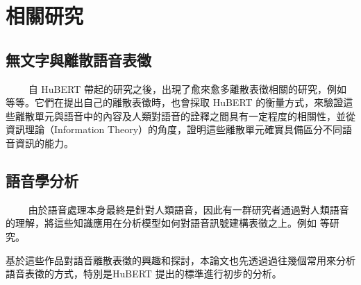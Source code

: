 
\section{相關研究}  %

\subsection{無文字與離散語音表徵}
　　
自 HuBERT 帶起的研究之後，出現了愈來愈多離散表徵相關的研究，例如 \cite{10097097, abdullah23_interspeech, chang_exploration_2023, liu2024dinosr, zhang2024speechtokenizer, huang2023repcodec} 等等。它們在提出自己的離散表徵時，也會採取 HuBERT 的衡量方式，來驗證這些離散單元與語音中的內容及人類對語音的詮釋之間具有一定程度的相關性，並從資訊理論（Information Theory）的角度，證明這些離散單元確實具備區分不同語音資訊的能力。

\subsection{語音學分析}
　　
由於語音處理本身最終是針對人類語音，因此有一群研究者通過對人類語音的理解，將這些知識應用在分析模型如何對語音訊號建構表徵之上。例如 \cite{deseyssel22_interspeech, wells_phonetic_2022, 10097097, abdullah23_interspeech} 等研究。

基於這些作品對語音離散表徵的興趣和探討，本論文也先透過過往幾個常用來分析語音表徵的方式，特別是HuBERT \cite{hsu_hubert_2021-2} 提出的標準進行初步的分析。

